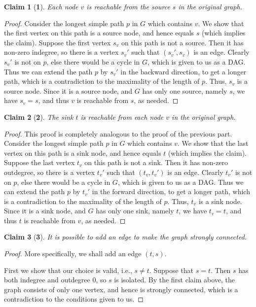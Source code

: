 \documentclass[answers]{exam}
\newtheorem*{claim}{Claim}
\begin{document}
\begin{questions}
\begin{parts}
\begin{solution}
\begin{enumerate}
    \begin{claim}[\textbf{1}]Each node $v$ is reachable from the source $s$ in the original graph.
    \end{claim}
    \begin{proof} Consider the longest simple path $p$ in $G$ which contains $v$. We show that the first vertex on this path is a source node, and hence equals $s$ (which implies the claim). Suppose the first vertex $s_v$ on this path is not a source. Then it has non-zero indegree, so there is a vertex $s_v'$ such that $(s_v', s_v)$ is an edge. Clearly $s_v'$ is not on $p$, else there would be a cycle in $G$, which is given to us as a DAG. Thus we can extend the path $p$ by $s_v'$ in the backward direction, to get a longer path, which is a contradiction to the maximality of the length of $p$. Thus, $s_v$ is a source node. Since it is a source node, and $G$ has only one source, namely $s$, we have $s_v = s$, and thus $v$ is reachable from $s$, as needed.
    \end{proof}
    \begin{claim}[\textbf{2}] The sink $t$ is reachable from each node $v$ in the original graph.
    \end{claim}
    \begin{proof} This proof is completely analogous to the proof of the previous part. Consider the longest simple path $p$ in $G$ which contains $v$. We show that the last vertex on this path is a sink node, and hence equals $t$ (which implies the claim). Suppose the last vertex $t_v$ on this path is not a sink. Then it has non-zero outdegree, so there is a vertex $t_v'$ such that $(t_v, t_v')$ is an edge. Clearly $t_v'$ is not on $p$, else there would be a cycle in $G$, which is given to us as a DAG. Thus we can extend the path $p$ by $t_v'$ in the forward direction, to get a longer path, which is a contradiction to the maximality of the length of $p$. Thus, $t_v$ is a sink node. Since it is a sink node, and $G$ has only one sink, namely $t$, we have $t_v = t$, and thus $t$ is reachable from $v$, as needed.
    \end{proof}
    \begin{claim}[\textbf{3}] It is possible to add an edge to make the graph strongly connected.
    \end{claim}
    \begin{proof}
    More specifically, we shall add an edge $(t, s)$. 
    
    First we show that our choice is valid, i.e., $s \ne t$. Suppose that $s = t$. Then $s$ has both indegree and outdegree $0$, so $s$ is isolated. By the first claim above, the graph consists of only one vertex, and hence is strongly connected, which is a contradiction to the conditions given to us.
    

\end{proof}
\end{enumerate}
\end{solution}
\end{parts}
\end{questions}
\end{document}
